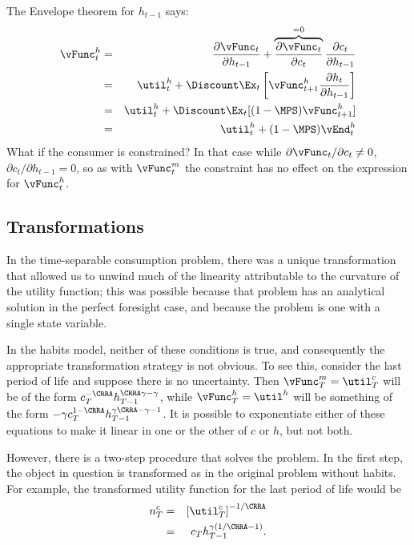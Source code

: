 \documentclass[titlepage]{\econtex}
\begin{document}
{  The Envelope theorem for $h_{t-1}$ says:
  \begin{eqnarray}
    {\vFunc}_{t}^{h} & = & \frac{\partial {\vFunc}_{t}}{\partial h_{t-1}} + \overbrace{\frac{\partial {\vFunc}_{t}}{\partial {c}_{t}}}^{=0}\frac{\partial {c}_{t}}{\partial h_{t-1}} \nonumber
    \\ & = & \util^{h}_{t} + \Discount \Ex_{t} \left[{\vFunc}_{t+1}^{h}\frac{\partial h_{t}}{\partial h_{t-1}} \right]\nonumber
    \\ & = & \util^{h}_{t} + \Discount \Ex_{t} [(1-\MPS) {\vFunc}_{t+1}^{h}] \nonumber
    \\ & = & \util^{h}_{t} + (1-\MPS) \vEnd_{t}^{h} \label{eq:vhtformula}
  \end{eqnarray}
  What if the consumer is constrained?  In that case while $\partial
  {\vFunc}_{t}/\partial {c}_{t} \neq 0$, $\partial {c}_{t}/\partial h_{t-1} = 0$, so as
  with ${\vFunc}_{t}^{m}$ the constraint has no effect on the expression for ${\vFunc}^{h}_{t}$.

  \hypertarget{Transforamtions}{}
  \subsection{Transformations}

  In the time-separable consumption problem, there was a unique
  transformation that allowed us to unwind much of the linearity
  attributable to the curvature of the utility function; this was
  possible because that problem has an analytical solution in the
  perfect foresight case, and because the problem is one with a single
  state variable.

  In the habits model, neither of these conditions is true, and
  consequently the appropriate transformation strategy is not obvious.
  To see this, consider the last period of life and suppose there is no
  uncertainty.  Then ${\vFunc}_{T}^{m} = \util_{T}^{c}$ will be of the form
  ${c}_{T}^{-\CRRA}h_{T-1}^{\CRRA \gamma - \gamma}$, while ${\vFunc}_{T}^{h} =
  \util^{h}$ will be something of the form $-\gamma
  {c}_{T}^{1-\CRRA}h_{T-1}^{\gamma\CRRA-\gamma-1}$.  It is possible to
  exponentiate either of these equations to make it linear in one or the
  other of ${c}$ or $h$, but not both.

  However, there is a two-step procedure that solves the problem.  In
  the first step, the object in question is transformed as in the
  original problem without habits.  For example, the transformed utility
  function for the last period of life would be
  \begin{eqnarray}
    n_{T}^{c} & = & \left[\util^{c}_{T}\right]^{-1/\CRRA}
    \\       & = & {c}_{T}h_{T-1}^{\gamma(1/\CRRA-1)}.
  \end{eqnarray}

}
\end{document}
